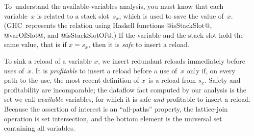 \documentclass[blockstyle,preprint,natbib,nocopyrightspace]{sigplanconf}
\newcommand\slotof[1]{\ensuremath{s_{#1}}}
\def\authornote#1{\unskip\relax}
\newcommand{\simon}[1]{\authornote{SLPJ: #1}}
\newcommand\delendum[1]{\relax\ifvmode\else\unskip\fi\relax}
\newcommand\seclabel[1]{\label{sec:#1}}
\newcommand\figref[1]{Figure~\ref{fig:#1}}
\begin{document}
\seclabel{avail}




To~understand the available-variables analysis, you must know that 
each variable~$x$ is related to a stack slot~\slotof x, which is used to
save the value of~$x$. 
(GHC~represents 
the relation using Haskell functions @isStackSlot@,
@varOfSlot@, and @isStackSlotOf@.)
If the variable and the stack slot hold the same value,
that is if $x = \slotof x$,
then it is \emph{safe} to insert a reload.

To sink a reload of a variable $x$, we insert redundant reloads immediately
before uses of~$x$.
It is \emph{profitable} to insert a reload before a use of~$x$ only if, 
on every path to the use, the most recent definition of $x$~is a reload from
$\slotof x$.
\delendum{I'm confused.  Surely that definition of profitable is also what we
mean by safe?  NR: No---safety could be establish by an arbitrary
assignment to~$x$ followed by a store to $\slotof x$.}
Safety and profitability are incomparable;
the dataflow fact computed by our analysis is the set we call
\emph{available} variables, for
which it is
safe \emph{and} profitable to insert a reload.
Because the assertion of interest is an ``all-paths'' property, 
the lattice-join operation is set intersection,
and the bottom element
is the universal set containing all variables.
\simon{%
I'm puzzled about why you are treating this example so differently
to constant-prop in Section 3.1.  It looks almost identical to me.  We could
keep a fact for every variable: $x=\bot$ means nothing is known; $x=s_x$ means
x's stack slot is up to date; $x=\top$ means x's stack slot is out of date.
Then keep a finite map as we do for constant prop.  If there is a difference
that drives the rep you have here, let's say so. If the difference is
purely accidental, we should eliminate it.

I am still unhappy on this point.  I think the difficulty is that we
want to represent \emph{both} the universal set \emph{and} the empty set.
But I'm unclear about the trade-offs in approximation that arise 
from this either-or representation.

NR \&\ JD: Availability is an all-paths property, and it's not obvious
to us that it can be modeled by an assertion about states.
\figref{avail} has only 24~lines of code.
Perhaps you could write an alternative implementation?
}
\end{document}
